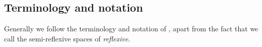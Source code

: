 \documentclass{article}
\theoremstyle{plain}
\theoremstyle{definition}
\begin{document}
\subsection*{Terminology and notation}
\label{subsection:terminology-and-notation}

Generally we follow the terminology and notation of \cite{3}, apart from the fact that we call the semi-reflexive spaces of \cite{3} \emph{reflexive}.



\nocite{*}

\begin{thebibliography}{10}
\end{thebibliography}
\end{document}
